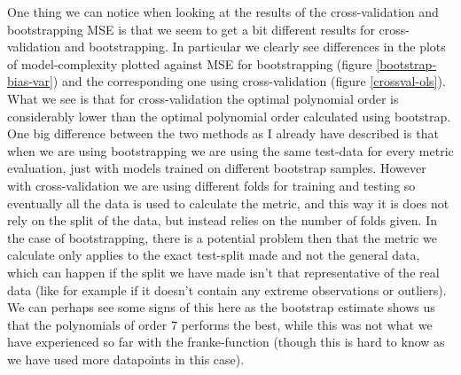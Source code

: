 \documentclass{article}
\begin{document}
One thing we can notice when looking at the results of the cross-validation and
bootstrapping MSE is that we seem to get a bit different results for
cross-validation and bootstrapping. In particular we clearly see differences in
the plots of model-complexity plotted against MSE for bootstrapping (figure
\ref{bootstrap-bias-var}) and the corresponding one using cross-validation
(figure \ref{crossval-ols}). What we see is that for cross-validation the optimal
polynomial order is considerably lower than the optimal polynomial order
calculated using bootstrap. One big difference between the two methods as I
already have described is that when we are using bootstrapping we are using the
same test-data for every metric evaluation, just with models trained on
different bootstrap samples. However with cross-validation we are using
different folds for training and testing so eventually all the data is used to
calculate the metric, and this way it is does not rely on the split of the data,
but instead relies on the number of folds given. In the case of bootstrapping,
there is a potential problem then that the metric we calculate only applies to
the exact test-split made and not the general data, which can happen if the
split we have made isn't that representative of the real data (like for example
if it doesn't contain any extreme observations or outliers).  We can perhaps see
some signs of this here as the bootstrap estimate shows us that the polynomials
of order $7$ performs the best, while this was not what we have experienced so
far with the franke-function (though this is hard to know as we have used more
datapoints in this case).
\end{document}
